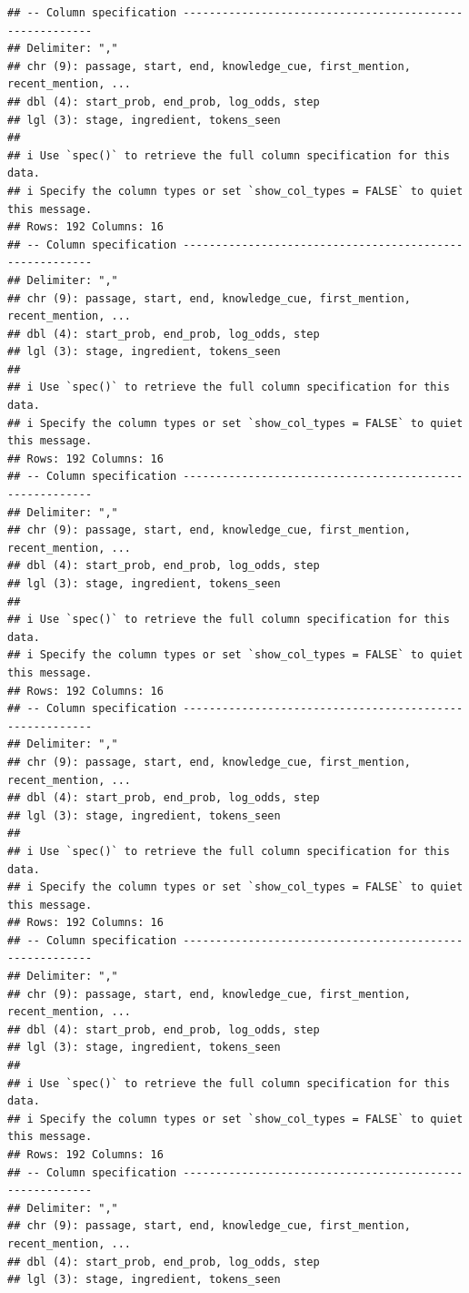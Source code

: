 \documentclass[
]{article}
\begin{document}
\begin{verbatim}
## -- Column specification --------------------------------------------------------
## Delimiter: ","
## chr (9): passage, start, end, knowledge_cue, first_mention, recent_mention, ...
## dbl (4): start_prob, end_prob, log_odds, step
## lgl (3): stage, ingredient, tokens_seen
## 
## i Use `spec()` to retrieve the full column specification for this data.
## i Specify the column types or set `show_col_types = FALSE` to quiet this message.
## Rows: 192 Columns: 16
## -- Column specification --------------------------------------------------------
## Delimiter: ","
## chr (9): passage, start, end, knowledge_cue, first_mention, recent_mention, ...
## dbl (4): start_prob, end_prob, log_odds, step
## lgl (3): stage, ingredient, tokens_seen
## 
## i Use `spec()` to retrieve the full column specification for this data.
## i Specify the column types or set `show_col_types = FALSE` to quiet this message.
## Rows: 192 Columns: 16
## -- Column specification --------------------------------------------------------
## Delimiter: ","
## chr (9): passage, start, end, knowledge_cue, first_mention, recent_mention, ...
## dbl (4): start_prob, end_prob, log_odds, step
## lgl (3): stage, ingredient, tokens_seen
## 
## i Use `spec()` to retrieve the full column specification for this data.
## i Specify the column types or set `show_col_types = FALSE` to quiet this message.
## Rows: 192 Columns: 16
## -- Column specification --------------------------------------------------------
## Delimiter: ","
## chr (9): passage, start, end, knowledge_cue, first_mention, recent_mention, ...
## dbl (4): start_prob, end_prob, log_odds, step
## lgl (3): stage, ingredient, tokens_seen
## 
## i Use `spec()` to retrieve the full column specification for this data.
## i Specify the column types or set `show_col_types = FALSE` to quiet this message.
## Rows: 192 Columns: 16
## -- Column specification --------------------------------------------------------
## Delimiter: ","
## chr (9): passage, start, end, knowledge_cue, first_mention, recent_mention, ...
## dbl (4): start_prob, end_prob, log_odds, step
## lgl (3): stage, ingredient, tokens_seen
## 
## i Use `spec()` to retrieve the full column specification for this data.
## i Specify the column types or set `show_col_types = FALSE` to quiet this message.
## Rows: 192 Columns: 16
## -- Column specification --------------------------------------------------------
## Delimiter: ","
## chr (9): passage, start, end, knowledge_cue, first_mention, recent_mention, ...
## dbl (4): start_prob, end_prob, log_odds, step
## lgl (3): stage, ingredient, tokens_seen

\end{verbatim}
\end{document}
